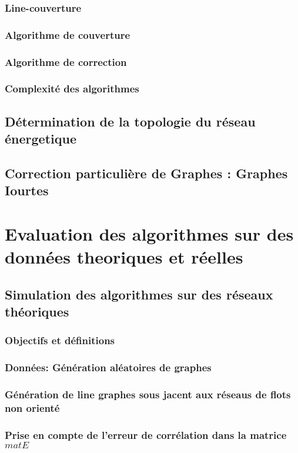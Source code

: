 \documentclass[onecolumn, 12pt]{book}
\begin{document}
		\subsection{Line-couverture}
		\subsection{Algorithme de couverture}
		\subsection{Algorithme de correction}
		\subsection{Complexit\'e des algorithmes}
	\section{D\'etermination de la topologie du r\'eseau \'energetique}
	\section{Correction particuli\`ere de Graphes : Graphes Iourtes }

\chapter{Evaluation des algorithmes sur des donn\'ees theoriques et r\'eelles}
	\section{Simulation des algorithmes sur des r\'eseaux th\'eoriques}
		\subsection{Objectifs et d\'efinitions}
		\subsection{Donn\'ees: G\'en\'eration al\'eatoires de graphes}
		\subsection{G\'en\'eration de line graphes sous jacent aux r\'eseaus de flots non orient\'e}
		\subsection{Prise en compte de l'erreur de corr\'elation dans la matrice $matE$}
\end{document}
